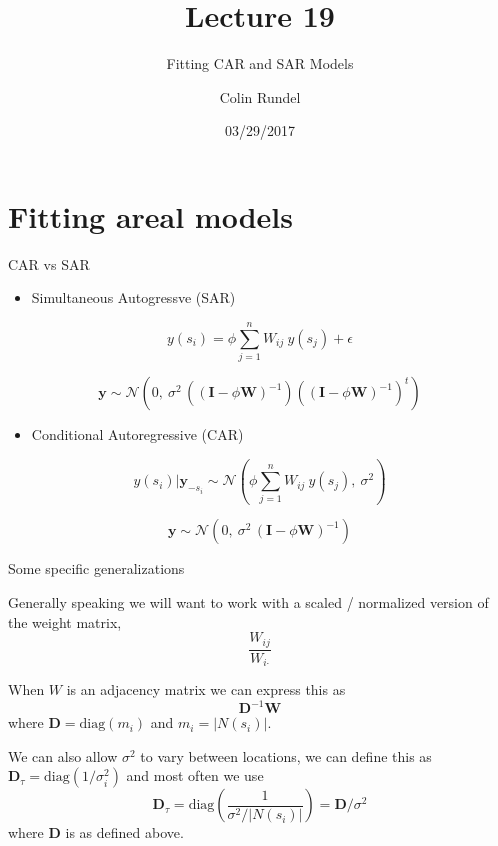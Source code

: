 \documentclass[11pt,ignorenonframetext,]{beamer}
\title{Lecture 19}
\subtitle{Fitting CAR and SAR Models}
\author{Colin Rundel}
\date{03/29/2017}
\providecommand{\tightlist}{%
  \setlength{\itemsep}{0pt}\setlength{\parskip}{0pt}}
\begin{document}
\frame{\titlepage}

\section{Fitting areal models}\label{fitting-areal-models}

\begin{frame}{CAR vs SAR}

\begin{itemize}
\tightlist
\item
  Simultaneous Autogressve (SAR)
\end{itemize}

\[ y(s_i) = \phi \sum_{j=1}^n W_{ij} ~ y(s_j) + \epsilon \]

\[ \bm{y} \sim \mathcal{N}(0,~\sigma^2 \, ((\bm{I}-\phi \bm{W})^{-1}) ((\bm{I}-\phi \bm{W})^{-1})^t )\]

\begin{itemize}
\tightlist
\item
  Conditional Autoregressive (CAR)
\end{itemize}

\[ y(s_i)|\bm{y}_{-s_i} \sim \mathcal{N}\left(\phi\sum_{j=1}^n {W}_{ij} ~ y(s_j),~ \sigma^2 \right) \]

\[ \bm{y} \sim \mathcal{N}(0,~\sigma^2 \, (\bm{I}-\phi \bm{W})^{-1})\]

\end{frame}

\begin{frame}[t]{Some specific generalizations}

Generally speaking we will want to work with a scaled / normalized
version of the weight matrix,
\[ \frac{W_{ij}}{W_{i\boldsymbol{\cdot}}}  \]

\vspace{6mm}

When \(W\) is an adjacency matrix we can express this as
\[ \bm{D}^{-1} \bm{W} \] where \(\bm{D} = \text{diag}(m_i)\) and
\(m_i = |N(s_i)|\).

\vspace{6mm}

We can also allow \(\sigma^2\) to vary between locations, we can define
this as \(\bm{D}_\tau = \text{diag}(1/\sigma^2_i)\) and most often we
use
\[ \bm{D}_\tau = \text{diag}\left(\frac{1}{\sigma^2 / |N(s_i)|}\right) = \bm{D} / \sigma^2  \]
where \(\bm{D}\) is as defined above.

\end{frame}
\end{document}
